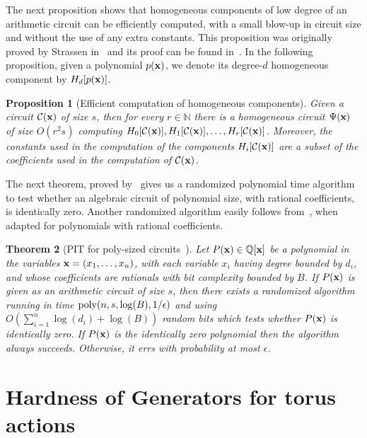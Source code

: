 \documentclass[10pt,a4paper]{article}
\newtheorem{theorem}{Theorem}
\newtheorem{proposition}[theorem]{Proposition}
\newcommand{\Q}{\mathbb Q}
\newcommand{\N}{\mathbb N}
\newcommand{\cC}{\mathcal C}
\newcommand{\bx}{\textbf x}
\begin{document}
The next proposition shows that homogeneous components of low degree
of an arithmetic circuit can be efficiently computed, with a small blow-up
in circuit size and without the use of any extra constants. This proposition was
originally proved by Strassen in~\cite{S73} and its proof can be found
in~\cite[Theorem 2.2]{SY10}.
In the following proposition, given a polynomial $p(\bx)$, we denote its degree-$d$ homogeneous component by $H_d[p(\bx)]$.

\begin{proposition}[Efficient computation of homogeneous components]\label{prop:hom-components}
	Given a circuit $\cC(\bx)$ of size $s$, then for every $r \in \N$
	there is a homogeneous circuit $\Psi(\bx)$ of size $O(r^2 s)$
	computing $H_0[\cC(\bx)], H_1[\cC(\bx)], \ldots, H_r[\cC(\bx)]$.
	Moreover, the constants used in the computation of the components $H_i[\cC(\bx)]$
	are a subset of the coefficients used in the computation of $\cC(\bx)$.
%
%
\end{proposition}

The next theorem, proved by~\cite[Theorem 4.10]{AB03} gives us a randomized polynomial time
algorithm to test whether an algebraic circuit of polynomial size, with rational
coefficients, is identically zero. Another randomized algorithm easily follows
from~\cite[Lemma 2]{S79}, when adapted for polynomials with rational coefficients.

\begin{theorem}[PIT for poly-sized circuits~\cite{AB03}]\label{thm:PIT-BPP}
	Let $P(\bx) \in \Q[\bx]$ be a polynomial in the variables $\bx = (x_1, \ldots, x_n)$, with
	each variable $x_i$ having degree bounded by $d_i$, and whose coefficients are rationals with
	bit complexity bounded by $B$. If $P(\bx)$ is given as an arithmetic circuit of size $s$, then
	there exists a randomized algorithm running in time ${\rm poly}(n, s, \log(B), 1/\epsilon)$
	and using $O\left(\sum_{i=1}^n \log(d_i) + \log(B) \right)$ random bits which tests whether $P(\bx)$ is identically zero.
	If $P(\bx)$ is the identically zero polynomial then the algorithm always succeeds.
	Otherwise, it errs with probability at most $\epsilon$.
\end{theorem}

\setcounter{theorem}{19}
\section{Hardness of Generators for torus actions}\label{sec:torus}
\end{document}
